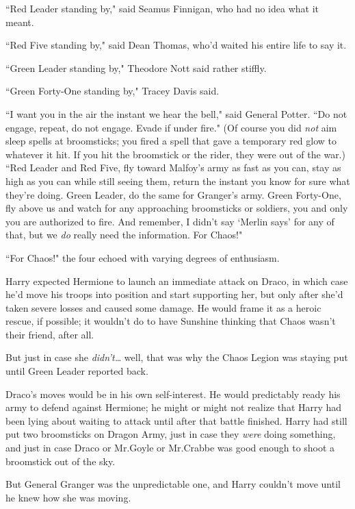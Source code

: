 ``Red Leader standing by," said Seamus Finnigan, who had no idea what it meant.

``Red Five standing by," said Dean Thomas, who'd waited his entire life to say it.

``Green Leader standing by," Theodore Nott said rather stiffly.

``Green Forty-One standing by," Tracey Davis said.

``I want you in the air the instant we hear the bell," said General Potter. ``Do not engage, repeat, do not engage. Evade if under fire." (Of course you did \emph{not} aim sleep spells at broomsticks; you fired a spell that gave a temporary red glow to whatever it hit. If you hit the broomstick or the rider, they were out of the war.) ``Red Leader and Red Five, fly toward Malfoy's army as fast as you can, stay as high as you can while still seeing them, return the instant you know for sure what they're doing. Green Leader, do the same for Granger's army. Green Forty-One, fly above us and watch for any approaching broomsticks or soldiers, you and only you are authorized to fire. And remember, I didn't say `Merlin says' for any of that, but we \emph{do} really need the information. For Chaos!"

``For Chaos!" the four echoed with varying degrees of enthusiasm.

Harry expected Hermione to launch an immediate attack on Draco, in which case he'd move his troops into position and start supporting her, but only after she'd taken severe losses and caused some damage. He would frame it as a heroic rescue, if possible; it wouldn't do to have Sunshine thinking that Chaos wasn't their friend, after all.

But just in case she \emph{didn't{\ldots}} well, that was why the Chaos Legion was staying put until Green Leader reported back.

Draco's moves would be in his own self-interest. He would predictably ready his army to defend against Hermione; he might or might not realize that Harry had been lying about waiting to attack until after that battle finished. Harry had still put two broomsticks on Dragon Army, just in case they \emph{were} doing something, and just in case Draco or Mr.\?Goyle or Mr.\?Crabbe was good enough to shoot a broomstick out of the sky.

But General Granger was the unpredictable one, and Harry couldn't move until he knew how she was moving.

\later

